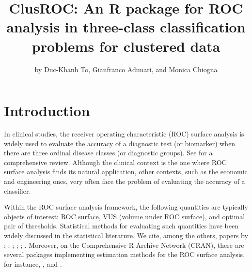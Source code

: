 \title{ClusROC: An R package for ROC analysis in three-class
classification problems for clustered data}
\author{by Duc-Khanh To, Gianfranco Adimari, and Monica Chiogna}

\maketitle


\hypertarget{introduction}{%
\section{Introduction}\label{introduction}}

In clinical studies, the receiver operating characteristic (ROC) surface analysis is widely used to evaluate the accuracy of a diagnostic test (or biomarker) when there are three ordinal disease classes (or diagnostic groups). See \citet{nak:14} for a comprehensive review. {\color{blue} Although the clinical context is the one where ROC surface analysis finds its natural application, other contexts,  such as the economic and engineering ones, very often face the problem of evaluating the accuracy of a classifier.}

Within the ROC surface analysis framework, the following quantities are typically objects of interest: ROC surface, VUS (volume under ROC surface), and optimal pair of thresholds. Statistical methods for evaluating such quantities have been widely discussed in the statistical literature. We cite, among the others, papers by \citet{nak:04}; \citet{xiong2006measuring}; \citet{nakas2010accuracy}; \citet{attwood2014diagnostic}; \citet{bantis2017construction}; \citet{toduc2016mar}. Moreover, on the Comprehensive R Archive Network (CRAN), there are several packages implementing estimation methods for the ROC surface analysis, for instance,  \citep{trinROC},  \citep{ThresholdROC} and  \citep{bcROCsurface}.

